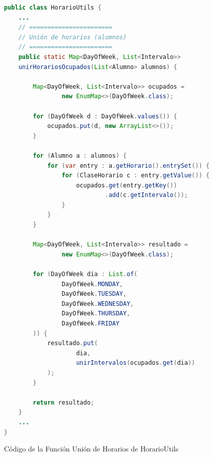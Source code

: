 \begin{figure}[H]
    \centering
    \begin{minipage}{0.9\textwidth}
    \caption{Código de la Función Unión de Horarios de HorarioUtils}
    \label{code:HorarioUtils-UnirHorarios}
    \vspace{-0.2cm}
    \begin{lstlisting}[language=Java, basicstyle=\scriptsize\ttfamily]
public class HorarioUtils {
    ...
    // =======================
    // Unión de horarios (alumnos)
    // =======================
    public static Map<DayOfWeek, List<Intervalo>>
    unirHorariosOcupados(List<Alumno> alumnos) {

        Map<DayOfWeek, List<Intervalo>> ocupados =
                new EnumMap<>(DayOfWeek.class);

        for (DayOfWeek d : DayOfWeek.values()) {
            ocupados.put(d, new ArrayList<>());
        }

        for (Alumno a : alumnos) {
            for (var entry : a.getHorario().entrySet()) {
                for (ClaseHorario c : entry.getValue()) {
                    ocupados.get(entry.getKey())
                            .add(c.getIntervalo());
                }
            }
        }

        Map<DayOfWeek, List<Intervalo>> resultado =
                new EnumMap<>(DayOfWeek.class);

        for (DayOfWeek dia : List.of(
                DayOfWeek.MONDAY,
                DayOfWeek.TUESDAY,
                DayOfWeek.WEDNESDAY,
                DayOfWeek.THURSDAY,
                DayOfWeek.FRIDAY
        )) {
            resultado.put(
                    dia,
                    unirIntervalos(ocupados.get(dia))
            );
        }

        return resultado;
    }
    ...
}
    \end{lstlisting}
    \end{minipage}
\end{figure}


